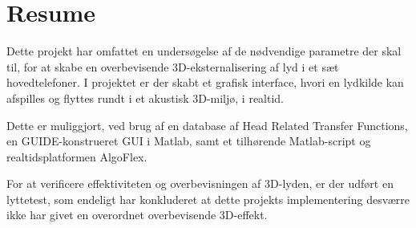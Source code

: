 \chapter*{Resume}

Dette projekt har omfattet en undersøgelse af de nødvendige parametre der skal til, for at skabe en overbevisende 3D-eksternalisering af lyd i et sæt hovedtelefoner. I projektet er der skabt et grafisk interface, hvori en lydkilde kan afspilles og flyttes rundt i et akustisk 3D-miljø, i realtid. 

Dette er muliggjort, ved brug af en database af Head Related Transfer Functions, en GUIDE-konstrueret GUI i Matlab, samt et tilhørende Matlab-script og realtidsplatformen AlgoFlex. 

For at verificere effektiviteten og overbevisningen af 3D-lyden, er der udført en lyttetest, som endeligt har konkluderet at dette projekts implementering desværre ikke har givet en overordnet overbevisende 3D-effekt. 



